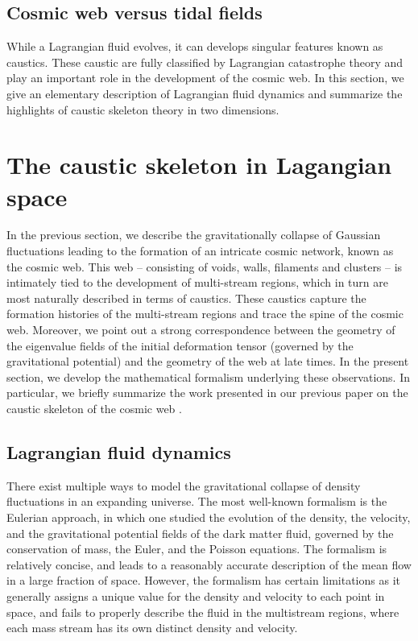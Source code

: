 \documentclass[a4paper, 11pt]{article}
\begin{document}
\subsection{Cosmic web versus tidal fields}
While a Lagrangian fluid evolves, it can develops singular features known as caustics. These caustic are fully classified by Lagrangian catastrophe theory and play an important role in the development of the cosmic web. In this section, we give an elementary description of Lagrangian fluid dynamics and summarize the highlights of caustic skeleton theory in two dimensions.

\section{The caustic skeleton in Lagangian space}\label{sec:Caustic_Skeleton_Theory}
In the previous section, we describe the gravitationally collapse of Gaussian fluctuations leading to the formation of an intricate cosmic network, known as the cosmic web. This web -- consisting of voids, walls, filaments and clusters -- is intimately tied to the development of multi-stream regions, which in turn are most naturally described in terms of caustics. These caustics capture the formation histories of the multi-stream regions and trace the spine of the cosmic web. Moreover, we point out a strong correspondence between the geometry of the eigenvalue fields of the initial deformation tensor (governed by the gravitational potential) and the geometry of the web at late times. In the present section, we develop the mathematical formalism underlying these observations. In particular, we briefly summarize the work presented in our previous paper on the caustic skeleton of the cosmic web \cite{Feldbrugge:2018}.



\subsection{Lagrangian fluid dynamics}
There exist multiple ways to model the gravitational collapse of density fluctuations in an expanding universe. The most well-known formalism is the Eulerian approach, in which one studied the evolution of the density, the velocity, and the gravitational potential fields of the dark matter fluid, governed by the conservation of mass, the Euler, and the Poisson equations. The formalism is relatively concise, and leads to a reasonably accurate description of the mean flow in a large fraction of space. However, the formalism has certain limitations as it generally assigns a unique value for the density and velocity to each point in space, and fails to properly describe the fluid in the multistream regions, where each mass stream has its own distinct density and velocity.
\end{document}
